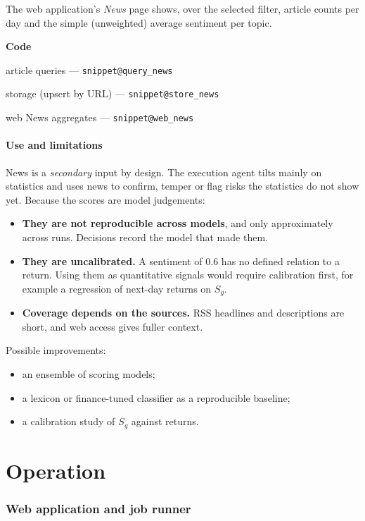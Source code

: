 \documentclass[11pt,a4paper]{article}
\makeatletter
\newcommand{\snippetsource}[1]{\csname snippet@#1\endcsname}
\newcommand{\snippet}[3]{%
  }
\newenvironment{codepointers}{%
  \par\smallskip\begingroup\footnotesize\noindent\textcolor{blue!50!black}{\textbf{Code}}\par\nopagebreak
  \begin{list}{}{\setlength{\leftmargin}{1.2em}\setlength{\itemsep}{0pt}\setlength{\parsep}{0pt}\setlength{\topsep}{1pt}}}%
  {\end{list}\endgroup\smallskip}
\newcommand{\codeitem}[2]{\item #2 --- \texttt{\snippetsource{#1}}}
\makeatother
\begin{document}
The web application's \emph{News} page shows, over the selected filter, article counts per
day and the simple (unweighted) average sentiment per topic.
\snippet{news_summary}{Python}{Relevance-weighted aggregation}
\begin{codepointers}
  \codeitem{query_news}{article queries}
  \codeitem{store_news}{storage (upsert by URL)}
  \codeitem{web_news}{web News aggregates}
\end{codepointers}

\subsection{Use and limitations}
News is a \emph{secondary} input by design. The execution agent tilts mainly on statistics
and uses news to confirm, temper or flag risks the statistics do not show yet. Because the
scores are model judgements:
\begin{itemize}
  \item \textbf{They are not reproducible across models}, and only approximately across
        runs. Decisions record the model that made them.
  \item \textbf{They are uncalibrated.} A sentiment of $0.6$ has no defined relation to a
        return. Using them as quantitative signals would require calibration first, for
        example a regression of next-day returns on $S_g$.
  \item \textbf{Coverage depends on the sources.} RSS headlines and descriptions are short,
        and web access gives fuller context.
\end{itemize}
Possible improvements:
\begin{itemize}
  \item an ensemble of scoring models;
  \item a lexicon or finance-tuned classifier as a reproducible baseline;
  \item a calibration study of $S_g$ against returns.
\end{itemize}

\part{Operation}

\section{Web application and job runner}\label{sec:web}
\end{document}
